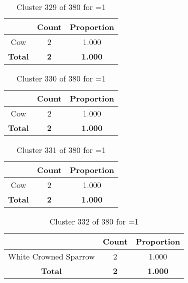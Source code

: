 \begin{table}[ht!]
\centering
\begin{tabular}{|c|c|c|}
\hline
\bf \Spec{} &\bf Count &\bf Proportion\\ \hline \hline
Cow & 2 & 1.000\\ \hline
\hline
\bf Total & \bf 2 & \bf 1.000\\ \hline
\end{tabular}
\label{tab:cluster:329:1}
\caption{Cluster 329 of 380 for \minneigh{}=1}
\end{table}

\clearpage
\begin{table}[ht!]
\centering
\begin{tabular}{|c|c|c|}
\hline
\bf \Spec{} &\bf Count &\bf Proportion\\ \hline \hline
Cow & 2 & 1.000\\ \hline
\hline
\bf Total & \bf 2 & \bf 1.000\\ \hline
\end{tabular}
\label{tab:cluster:330:1}
\caption{Cluster 330 of 380 for \minneigh{}=1}
\end{table}

\begin{table}[ht!]
\centering
\begin{tabular}{|c|c|c|}
\hline
\bf \Spec{} &\bf Count &\bf Proportion\\ \hline \hline
Cow & 2 & 1.000\\ \hline
\hline
\bf Total & \bf 2 & \bf 1.000\\ \hline
\end{tabular}
\label{tab:cluster:331:1}
\caption{Cluster 331 of 380 for \minneigh{}=1}
\end{table}

\begin{table}[ht!]
\centering
\begin{tabular}{|c|c|c|}
\hline
\bf \Spec{} &\bf Count &\bf Proportion\\ \hline \hline
White Crowned Sparrow & 2 & 1.000\\ \hline
\hline
\bf Total & \bf 2 & \bf 1.000\\ \hline
\end{tabular}
\label{tab:cluster:332:1}
\caption{Cluster 332 of 380 for \minneigh{}=1}
\end{table}

